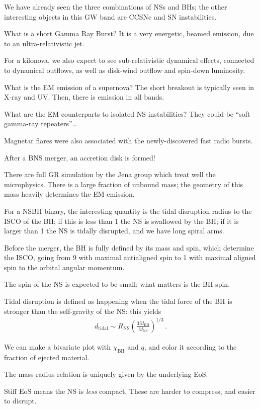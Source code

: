 \documentclass[main.tex]{subfiles}
\begin{document}
We have already seen the three combinations of NSs and BHs; 
the other interesting objects in this GW band
are CCSNe and SN instabilities. 

What is a short Gamma Ray Burst?
It is a very energetic, beamed emission, due to an ultra-relativistic jet. 

For a kilonova, we also expect to see sub-relativistic dynamical effects, connected to dynamical outflows, as well as disk-wind outflow and spin-down luminosity. 

What is the EM emission of a supernova? 
The short breakout is typically seen in X-ray and UV. 
Then, there is emission in all bands. 

What are the EM counterparts to isolated NS instabilities? 
They could be ``soft gamma-ray repeaters''\dots

Magnetar flares were also associated with the newly-discovered fast radio bursts. 

After a BNS merger, an accretion disk is formed! 

There are full GR simulation by the Jena group which treat well the microphysics. 
There is a large fraction of unbound mass; the geometry of this mass heavily 
determines the EM emission. 

For a NSBH binary, the interesting quantity is the tidal disruption radius to the 
ISCO of the BH; if this is less than 1 the NS is swallowed by the BH; 
if it is larger than 1 the NS is tidally disrupted, and we have long spiral arms.

Before the merger, the BH is fully defined by its mass and spin, which determine the ISCO, going from 9 with maximal antialigned spin to 1 with maximal aligned spin to the orbital angular momentum. 

The spin of the NS is expected to be small; what matters is the BH spin. 

Tidal disruption is defined as happening when the tidal force of the BH is 
stronger than the self-gravity of the NS: this yields 
%
\begin{align}
d _{\text{tidal}} \sim R _{\text{NS}} \left(\frac{3 M _{\text{BH}}}{M _{\text{NS}}}\right)^{1/3}
\,.
\end{align}

We can make a bivariate plot with \(\chi _{\text{BH}}\) and \(q\), and color it according to 
the fraction of ejected material. 

The mass-radius relation is uniquely given by the underlying EoS. 

Stiff EoS means the NS is \emph{less} compact. 
These are harder to compress, and easier to disrupt. 
\end{document}
